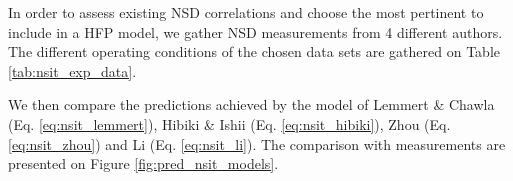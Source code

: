 \npar

In order to assess existing NSD correlations and choose the most pertinent to include in a HFP model, we gather NSD measurements from 4 different authors. The different operating conditions of the chosen data sets are gathered on Table \ref{tab:nsit_exp_data}.


\begin{table}[h!]


\noindent{}

\caption{Nucleation Site Density data in flow boiling}
\label{tab:nsit_exp_data}


\end{table}



We then compare the predictions achieved by the model of Lemmert \& Chawla (Eq. \ref{eq:nsit_lemmert}), Hibiki \& Ishii (Eq. \ref{eq:nsit_hibiki}), Zhou \etal (Eq. \ref{eq:nsit_zhou}) and Li \etal (Eq. \ref{eq:nsit_li}).  The comparison with measurements are presented on Figure \ref{fig:pred_nsit_models}.





